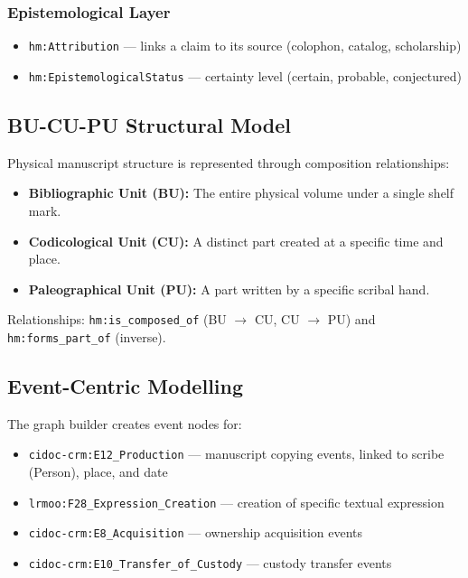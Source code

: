 \documentclass[12pt]{article}
\newcommand{\code}[1]{\texttt{#1}}
\begin{document}
\subsubsection{Epistemological Layer}

\begin{itemize}
\item \code{hm:Attribution} --- links a claim to its source (colophon, catalog, scholarship)
\item \code{hm:EpistemologicalStatus} --- certainty level (certain, probable, conjectured)
\end{itemize}

\subsection{BU-CU-PU Structural Model}

Physical manuscript structure is represented through composition relationships:

\begin{itemize}
\item \textbf{Bibliographic Unit (BU):} The entire physical volume under a single shelf mark.
\item \textbf{Codicological Unit (CU):} A distinct part created at a specific time and place.
\item \textbf{Paleographical Unit (PU):} A part written by a specific scribal hand.
\end{itemize}

Relationships: \code{hm:is\_composed\_of} (BU $\to$ CU, CU $\to$ PU) and \code{hm:forms\_part\_of} (inverse).

\subsection{Event-Centric Modelling}

The graph builder creates event nodes for:

\begin{itemize}
\item \code{cidoc-crm:E12\_Production} --- manuscript copying events, linked to scribe (Person), place, and date
\item \code{lrmoo:F28\_Expression\_Creation} --- creation of specific textual expression
\item \code{cidoc-crm:E8\_Acquisition} --- ownership acquisition events
\item \code{cidoc-crm:E10\_Transfer\_of\_Custody} --- custody transfer events
\end{itemize}
\end{document}
